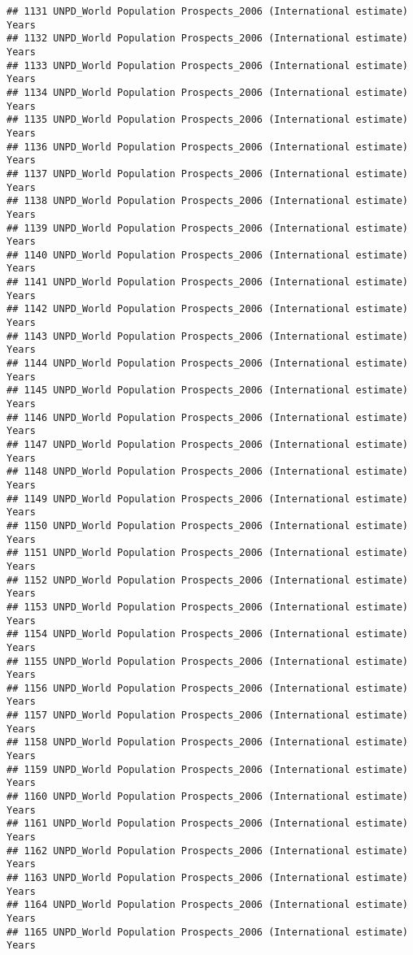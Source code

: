 \documentclass[]{article}
\begin{document}
\begin{verbatim}
## 1131 UNPD_World Population Prospects_2006 (International estimate) Years
## 1132 UNPD_World Population Prospects_2006 (International estimate) Years
## 1133 UNPD_World Population Prospects_2006 (International estimate) Years
## 1134 UNPD_World Population Prospects_2006 (International estimate) Years
## 1135 UNPD_World Population Prospects_2006 (International estimate) Years
## 1136 UNPD_World Population Prospects_2006 (International estimate) Years
## 1137 UNPD_World Population Prospects_2006 (International estimate) Years
## 1138 UNPD_World Population Prospects_2006 (International estimate) Years
## 1139 UNPD_World Population Prospects_2006 (International estimate) Years
## 1140 UNPD_World Population Prospects_2006 (International estimate) Years
## 1141 UNPD_World Population Prospects_2006 (International estimate) Years
## 1142 UNPD_World Population Prospects_2006 (International estimate) Years
## 1143 UNPD_World Population Prospects_2006 (International estimate) Years
## 1144 UNPD_World Population Prospects_2006 (International estimate) Years
## 1145 UNPD_World Population Prospects_2006 (International estimate) Years
## 1146 UNPD_World Population Prospects_2006 (International estimate) Years
## 1147 UNPD_World Population Prospects_2006 (International estimate) Years
## 1148 UNPD_World Population Prospects_2006 (International estimate) Years
## 1149 UNPD_World Population Prospects_2006 (International estimate) Years
## 1150 UNPD_World Population Prospects_2006 (International estimate) Years
## 1151 UNPD_World Population Prospects_2006 (International estimate) Years
## 1152 UNPD_World Population Prospects_2006 (International estimate) Years
## 1153 UNPD_World Population Prospects_2006 (International estimate) Years
## 1154 UNPD_World Population Prospects_2006 (International estimate) Years
## 1155 UNPD_World Population Prospects_2006 (International estimate) Years
## 1156 UNPD_World Population Prospects_2006 (International estimate) Years
## 1157 UNPD_World Population Prospects_2006 (International estimate) Years
## 1158 UNPD_World Population Prospects_2006 (International estimate) Years
## 1159 UNPD_World Population Prospects_2006 (International estimate) Years
## 1160 UNPD_World Population Prospects_2006 (International estimate) Years
## 1161 UNPD_World Population Prospects_2006 (International estimate) Years
## 1162 UNPD_World Population Prospects_2006 (International estimate) Years
## 1163 UNPD_World Population Prospects_2006 (International estimate) Years
## 1164 UNPD_World Population Prospects_2006 (International estimate) Years
## 1165 UNPD_World Population Prospects_2006 (International estimate) Years

\end{verbatim}
\end{document}
